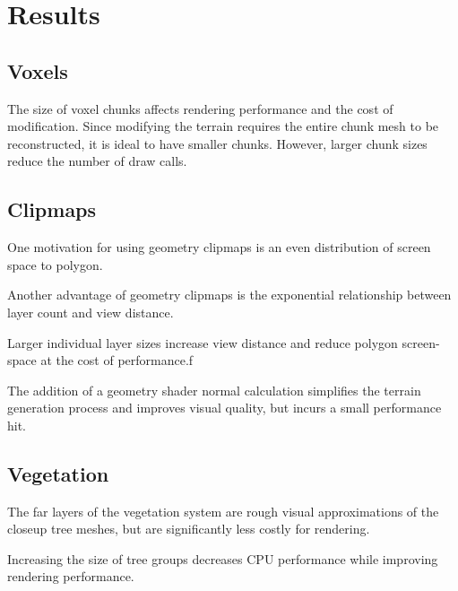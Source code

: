 
\chapter{Results}


\section{Voxels}

The size of voxel chunks affects rendering performance and the cost of modification.
Since modifying the terrain requires the entire chunk mesh to be reconstructed, it is ideal to have smaller chunks.
However, larger chunk sizes reduce the number of draw calls.



\section{Clipmaps}

One motivation for using geometry clipmaps is an even distribution of screen space to polygon.

Another advantage of geometry clipmaps is the exponential relationship between layer count and view distance.

Larger individual layer sizes increase view distance and reduce polygon screen-space at the cost of performance.f

The addition of a geometry shader normal calculation simplifies the terrain generation process and improves visual quality, but incurs a small performance hit.


\section{Vegetation}

The far layers of the vegetation system are rough visual approximations of the closeup tree meshes, but are significantly less costly for rendering.

Increasing the size of tree groups decreases CPU performance while improving rendering performance.


